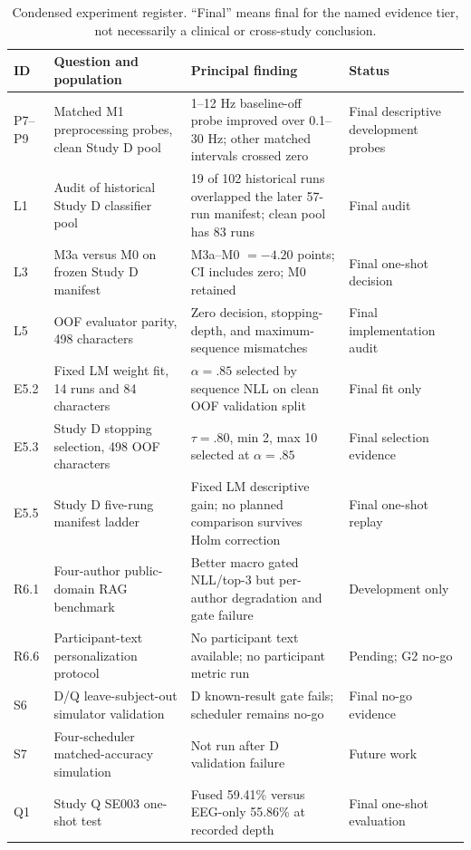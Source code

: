 \documentclass[final,5p,times,twocolumn,authoryear]{elsarticle}
\begin{document}
\begin{table}[t]
\centering\small
\caption{Condensed experiment register. ``Final'' means final for the named evidence tier, not necessarily a clinical or cross-study conclusion.}\label{tab:experiment-register}
\begin{tabular}{p{}p{}p{}p{}}
\toprule
ID & Question and population & Principal finding & Status\\
\midrule
P7--P9 & Matched M1 preprocessing probes, clean Study D pool & 1--12 Hz baseline-off probe improved over 0.1--30 Hz; other matched intervals crossed zero & Final descriptive development probes\\
L1 & Audit of historical Study D classifier pool & 19 of 102 historical runs overlapped the later 57-run manifest; clean pool has 83 runs & Final audit\\
L3 & M3a versus M0 on frozen Study D manifest & M3a--M0 $=-4.20$ points; CI includes zero; M0 retained & Final one-shot decision\\
L5 & OOF evaluator parity, 498 characters & Zero decision, stopping-depth, and maximum-sequence mismatches & Final implementation audit\\
E5.2 & Fixed LM weight fit, 14 runs and 84 characters & $\alpha=.85$ selected by sequence NLL on clean OOF validation split & Final fit only\\
E5.3 & Study D stopping selection, 498 OOF characters & $\tau=.80$, min 2, max 10 selected at $\alpha=.85$ & Final selection evidence\\
E5.5 & Study D five-rung manifest ladder & Fixed LM descriptive gain; no planned comparison survives Holm correction & Final one-shot replay\\
R6.1 & Four-author public-domain RAG benchmark & Better macro gated NLL/top-3 but per-author degradation and gate failure & Development only\\
R6.6 & Participant-text personalization protocol & No participant text available; no participant metric run & Pending; G2 no-go\\
S6 & D/Q leave-subject-out simulator validation & D known-result gate fails; scheduler remains no-go & Final no-go evidence\\
S7 & Four-scheduler matched-accuracy simulation & Not run after D validation failure & Future work\\
Q1 & Study Q SE003 one-shot test & Fused 59.41\% versus EEG-only 55.86\% at recorded depth & Final one-shot evaluation\\
\bottomrule
\end{tabular}
\end{table}
\end{document}
